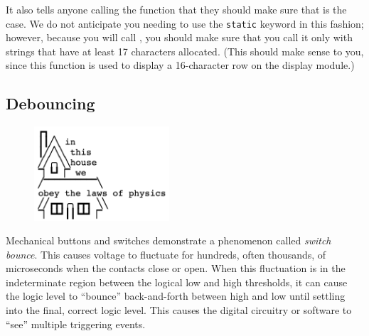 It also tells anyone calling the function that they should make sure that is the case.
%
We do not anticipate you needing to use the \lstinline{static} keyword in this fashion;
however, because you will call , you should make sure that you call it only with strings that have at least 17 characters allocated.
(This should make sense to you, since this function is used to display a 16-character row on the display module.)


\subsection{Debouncing} \label{subsec:debouncing}

\begin{figure}[h]
    \centering
    \includegraphics[height=3.5cm]{in-this-house}
\end{figure}

Mechanical buttons and switches demonstrate a phenomenon called \textit{switch bounce}.
This causes voltage to fluctuate for hundreds, often thousands, of microseconds when the contacts close or open.
When this fluctuation is in the indeterminate region between the logical low and high thresholds, it can cause the logic level to ``bounce'' back-and-forth between high and low until settling into the final, correct logic level.
This causes the digital circuitry or software to ``see'' multiple triggering events.


